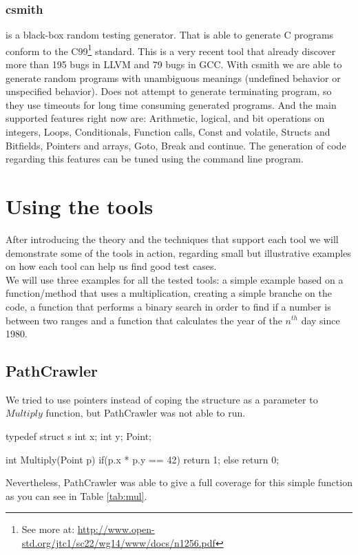 \documentclass[10pt, conference, compsocconf]{IEEEtran}
\begin{document}
\subsubsection{\textbf{csmith}\cite{Yang:2011:FUB:1993316.1993532}} is a black-box random testing generator. That is able to generate C programs
conform to the C99\footnote{See more at: \url{http://www.open-std.org/jtc1/sc22/wg14/www/docs/n1256.pdf}} standard. This is a very recent tool that already discover
more than 195 bugs in LLVM and 79 bugs in GCC. With csmith we are able to generate random programs with unambiguous meanings (undefined behavior or 
unspecified behavior). Does not attempt to generate terminating program, so they use timeouts for long time consuming generated programs.
And the main supported features right now are: Arithmetic, logical, and bit operations on integers, Loops, Conditionals, Function calls, Const and volatile,
Structs and Bitfields, Pointers and arrays, Goto, Break and continue. The generation of code regarding this features can be tuned using the command line program.

\section{Using the tools}
After introducing the theory and the techniques that support each tool we will demonstrate some of the tools in action, regarding small but illustrative examples
on how each tool can help us find good test cases.\\
We will use three examples for all the tested tools: a simple example based on a function/method that uses a multiplication, creating a simple branche on the code,
a function that performs a binary search in order to find if a number is between two ranges and a function that calculates the year of the $n^{th}$ day since 1980.

\subsection{PathCrawler}
We tried to use pointers instead of coping the structure as a parameter to $Multiply$ function, but PathCrawler was not able to run.
\begin{code}
typedef struct s {
    int x;
    int y;
}Point;

int Multiply(Point p) {
    if(p.x * p.y == 42) return 1;
    else return 0;
}
\end{code}

Nevertheless, PathCrawler was able to give a full coverage for this simple function as you can see in Table \ref{tab:mul}.
\end{document}
